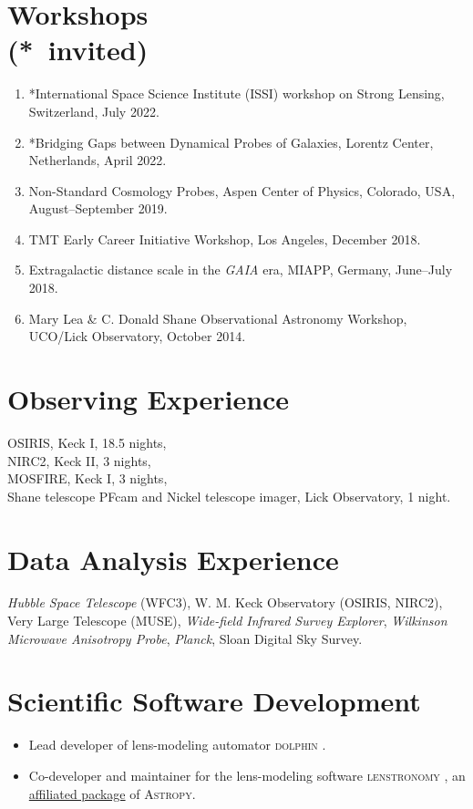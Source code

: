 \documentclass[margin, line]{res}
\begin{document}
\begin{resume}
\section{\sc Workshops \\ ({*}\ invited)}
\begin{enumerate}
	\item *International Space Science Institute (ISSI) workshop on Strong Lensing, Switzerland, July 2022.
	\item *Bridging Gaps between Dynamical Probes of Galaxies, Lorentz Center, Netherlands, April 2022.
	\item Non-Standard Cosmology Probes, Aspen Center of Physics, Colorado, USA, August--September 2019.
	\item TMT Early Career Initiative Workshop, Los Angeles, December 2018.
	\item Extragalactic distance scale in the \textit{GAIA} era, MIAPP, Germany, June--July 2018.
	\item Mary Lea \& C. Donald Shane Observational Astronomy Workshop, UCO/Lick Observatory, October 2014.
\end{enumerate}

\section{\sc Observing Experience}
OSIRIS, Keck I, 18.5 nights,\\
NIRC2, Keck II, 3 nights, \\
MOSFIRE, Keck I, 3 nights, \\
Shane telescope PFcam and Nickel telescope imager, Lick Observatory, 1 night.


\section{\sc Data Analysis Experience}
\textit{Hubble Space Telescope} (WFC3), 
W. M. Keck Observatory (OSIRIS, NIRC2),
Very Large Telescope (MUSE),
{\it Wide-field Infrared Survey Explorer},
{\it Wilkinson Microwave Anisotropy Probe},
{\it Planck},
Sloan Digital Sky Survey.

\section{\sc Scientific Software Development} 
\begin{itemize}
	\item Lead developer of lens-modeling automator \textsc{dolphin} \href{https://github.com/ajshajib/dolphin}{\faGithub}.
	\item Co-developer and maintainer for the lens-modeling software \textsc{lenstronomy} \href{https://github.com/lenstronomy/lenstronomy}{\faGithub}, an \href{https://www.astropy.org/affiliated/index.html}{affiliated package} of \textsc{Astropy}.
\end{itemize}


\end{resume}
\end{document}
